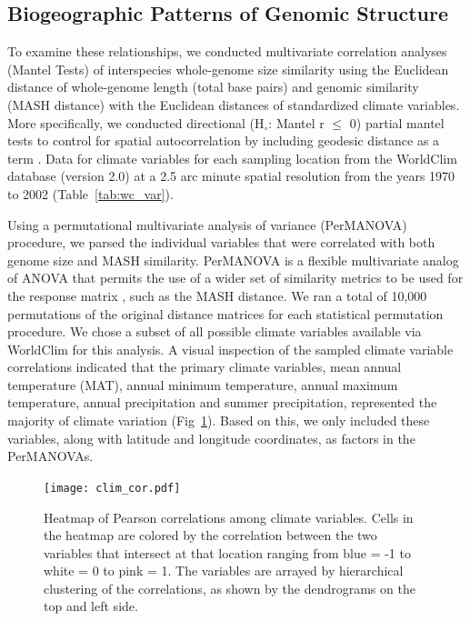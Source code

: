 \documentclass[fleqn,10pt,lineno]{wlpeerj} %
\begin{document}
\subsection*{Biogeographic Patterns of Genomic Structure}

To examine these relationships, we conducted multivariate correlation
analyses (Mantel Tests) of interspecies whole-genome size similarity
using the Euclidean distance of whole-genome length (total base pairs)
and genomic similarity (MASH distance) with the Euclidean distances of
standardized climate variables. More specifically, we conducted
directional (H$_{\circ}$: Mantel r $\leq$ 0) partial mantel tests to control
for spatial autocorrelation by including geodesic distance as a term
\citep{Goslee2007}. Data for climate variables for each sampling
location from the WorldClim database (version 2.0) at a 2.5 arc minute
spatial resolution from the years 1970 to 2002 \citep{Fick2017}
(Table~\ref{tab:wc_var}).



Using a permutational multivariate analysis of variance (PerMANOVA)
procedure, we parsed the individual variables that were correlated
with both genome size and MASH similarity. PerMANOVA is a flexible
multivariate analog of ANOVA that permits the use of a wider set of
similarity metrics to be used for the response matrix
\citep{Anderson2001}, such as the MASH distance. We ran a total of
10,000 permutations of the original distance matrices for each
statistical permutation procedure. We chose a subset of all possible
climate variables available via WorldClim for this analysis. A visual
inspection of the sampled climate variable correlations indicated that
the primary climate variables, mean annual temperature (MAT), annual
minimum temperature, annual maximum temperature, annual precipitation
and summer precipitation, represented the majority of climate
variation (Fig~\ref{fig:clim_cor}). Based on this, we only included these
variables, along with latitude and longitude coordinates, as factors
in the PerMANOVAs.

\begin{figure}[ht]
\texttt{[image: clim\_cor.pdf]}
\caption{Heatmap of Pearson correlations among climate
  variables. Cells in the heatmap are colored by the correlation
  between the two variables that intersect at that location ranging
  from blue = -1 to white = 0 to pink = 1. The variables are arrayed
  by hierarchical clustering of the correlations, as shown by the
  dendrograms on the top and left side.}
\label{fig:clim_cor}
\end{figure}
\end{document}
